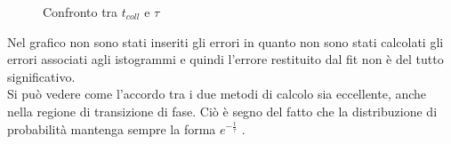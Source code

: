 \begin{center}
	\begin{figure}[h!]
		\centering
	\caption{Confronto tra $t_{coll}$ e $\tau$}
	\end{figure}
\end{center}
Nel grafico non sono stati inseriti gli errori in quanto non sono stati calcolati gli errori associati agli istogrammi e quindi l'errore restituito dal fit non è del tutto significativo.\\
Si può vedere come l'accordo tra i due metodi di calcolo sia eccellente, anche nella regione di transizione di fase.
Ciò è segno del fatto che la distribuzione di probabilità mantenga sempre la forma $e^{-\frac{t}{\tau}}$ .




